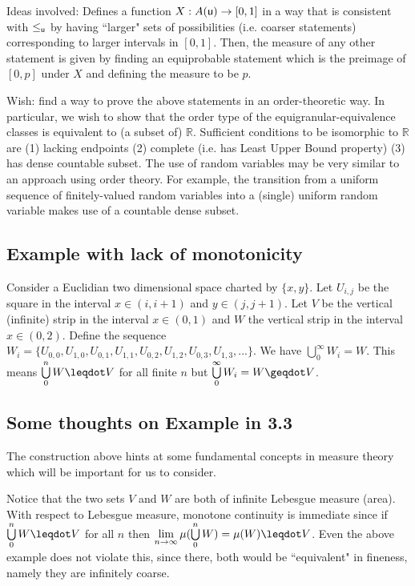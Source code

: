 \documentclass[10pt, onecolumn, nofootinbib]{revtex4-2}
\begin{document}
Ideas involved: Defines a function $X:A(\stmt[u])\to [0,1]$ in a way that is consistent with $\lequ$ by having ``larger" sets of possibilities (i.e. coarser statements) corresponding to larger intervals in $[0,1]$. Then, the measure of any other statement is given by finding an equiprobable statement which is the preimage of $[0,p]$ under $X$ and defining the measure to be $p$.  

Wish: find a way to prove the above statements in an order-theoretic way. In particular, we wish to show that the order type of the equigranular-equivalence classes is equivalent to (a subset of) $\mathbb{R}$. Sufficient conditions to be isomorphic to $\mathbb{R}$ are (1) lacking endpoints (2) complete (i.e. has Least Upper Bound property) (3) has dense countable subset. The use of random variables may be very similar to an approach using order theory. For example, the transition from a uniform sequence of finitely-valued random variables into a (single) uniform random variable makes use of a countable dense subset. 








\subsection{Example with lack of monotonicity}

Consider a Euclidian two dimensional space charted by $\{x,y\}$. Let $U_{i,j}$ be the square in the interval $x \in (i, i+1)$ and $y \in (j, j+1)$. Let $V$ be the vertical (infinite) strip in the interval $x \in (0, 1)$ and $W$ the vertical strip in the interval $x \in (0, 2)$. Define the sequence $W_i = \{ U_{0,0}, U_{1,0}, U_{0,1}, U_{1,1}, U_{0,2}, U_{1,2}, U_{0,3}, U_{1,3}, ... \}$. We have $\bigcup\limits_0^\infty W_i = W$. This means $\bigcup\limits_0^n W\finer V$ for all finite $n$ but $\bigcup\limits_0^\infty W_i = W \coarser V$. 

\subsection{Some thoughts on Example in 3.3}

The construction above hints at some fundamental concepts in measure theory which will be important for us to consider. 

Notice that the two sets $V$ and $W$ are both of infinite Lebesgue measure (area). With respect to Lebesgue measure, monotone continuity is immediate since if $\bigcup\limits_0^n W\finer V$ for all $n$ then $\lim\limits_{n\to\infty}\mu(\bigcup\limits_0^n W) = \mu(W)\finer V$. Even the above example does not violate this, since there, both would be ``equivalent" in fineness, namely they are infinitely coarse.
\end{document}
